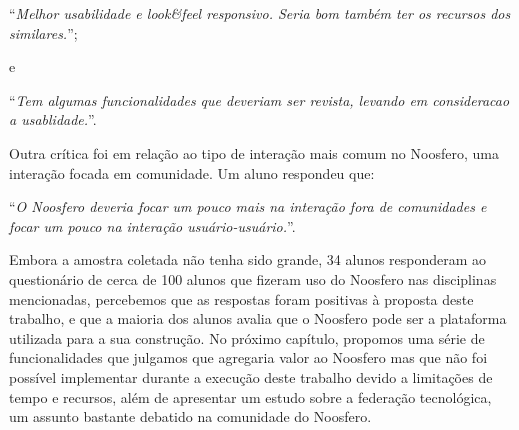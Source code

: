 \begin{center}
``\textit{Melhor usabilidade e look\&feel responsivo. Seria bom também ter os
recursos dos similares.}'';
\end{center}

e

\begin{center}
``\textit{Tem algumas funcionalidades que deveriam ser revista, levando em
consideracao a usablidade.}''.
\end{center}

Outra crítica foi em relação ao tipo de interação mais comum no Noosfero,
uma interação focada em comunidade. Um aluno respondeu que:

\begin{center}
``\textit{O Noosfero deveria focar um pouco mais na interação fora de
comunidades e focar um pouco na interação usuário-usuário.}''.
\end{center}


Embora a amostra coletada não tenha sido grande, 34 alunos responderam ao
questionário de cerca de 100 alunos que fizeram uso do Noosfero nas disciplinas
mencionadas, percebemos que as respostas foram positivas à proposta deste
trabalho, e que a maioria dos alunos avalia que o Noosfero pode ser a plataforma
utilizada para a sua construção.
%
No próximo capítulo, propomos uma série de funcionalidades que julgamos que
agregaria valor ao Noosfero mas que não foi possível implementar durante a
execução deste trabalho devido a limitações de tempo e recursos, além de 
apresentar um estudo sobre a federação tecnológica, um assunto bastante
debatido na comunidade do Noosfero.
